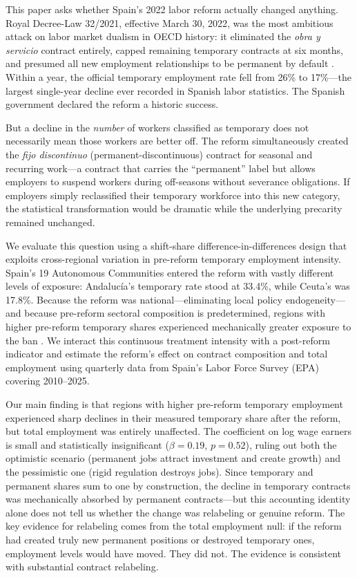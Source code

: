 \documentclass[12pt]{article}
\begin{document}
This paper asks whether Spain's 2022 labor reform actually changed anything. Royal Decree-Law 32/2021, effective March 30, 2022, was the most ambitious attack on labor market dualism in OECD history: it eliminated the \emph{obra y servicio} contract entirely, capped remaining temporary contracts at six months, and presumed all new employment relationships to be permanent by default \citep{imf2024spain}. Within a year, the official temporary employment rate fell from 26\% to 17\%---the largest single-year decline ever recorded in Spanish labor statistics. The Spanish government declared the reform a historic success.

But a decline in the \emph{number} of workers classified as temporary does not necessarily mean those workers are better off. The reform simultaneously created the \emph{fijo discontinuo} (permanent-discontinuous) contract for seasonal and recurring work---a contract that carries the ``permanent'' label but allows employers to suspend workers during off-seasons without severance obligations. If employers simply reclassified their temporary workforce into this new category, the statistical transformation would be dramatic while the underlying precarity remained unchanged.

We evaluate this question using a shift-share difference-in-differences design that exploits cross-regional variation in pre-reform temporary employment intensity. Spain's 19 Autonomous Communities entered the reform with vastly different levels of exposure: Andaluc\'{i}a's temporary rate stood at 33.4\%, while Ceuta's was 17.8\%. Because the reform was national---eliminating local policy endogeneity---and because pre-reform sectoral composition is predetermined, regions with higher pre-reform temporary shares experienced mechanically greater exposure to the ban \citep{goldsmith2020bartik}. We interact this continuous treatment intensity with a post-reform indicator and estimate the reform's effect on contract composition and total employment using quarterly data from Spain's Labor Force Survey (EPA) covering 2010--2025.

Our main finding is that regions with higher pre-reform temporary employment experienced sharp declines in their measured temporary share after the reform, but total employment was entirely unaffected. The coefficient on log wage earners is small and statistically insignificant ($\beta = 0.19$, $p = 0.52$), ruling out both the optimistic scenario (permanent jobs attract investment and create growth) and the pessimistic one (rigid regulation destroys jobs). Since temporary and permanent shares sum to one by construction, the decline in temporary contracts was mechanically absorbed by permanent contracts---but this accounting identity alone does not tell us whether the change was relabeling or genuine reform. The key evidence for relabeling comes from the total employment null: if the reform had created truly new permanent positions or destroyed temporary ones, employment levels would have moved. They did not. The evidence is consistent with substantial contract relabeling.
\end{document}
